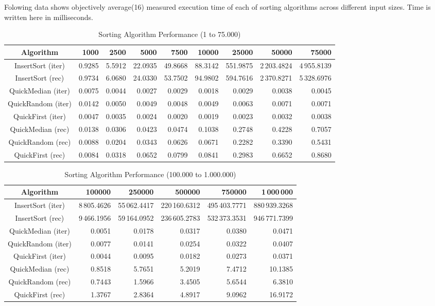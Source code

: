 \documentclass{article}
\begin{document}
Folowing data shows objectively average(16) measured execution time of each of sorting algorithms across different input sizes. Time is written here in milliseconds.
\begin{table}[h!]
    \centering
    \caption{Sorting Algorithm Performance (1 to 75.000)}
    \begin{tabular}{|c|r|r|r|r|r|r|r|r|}
        \toprule
        Algorithm & 1000 & 2500 & 5000 & 7500 & 10000 & 25000 & 50000 & 75000 \\
        \midrule
        InsertSort (iter) & 0.9285 & 5.5912 & 22.0935 & 49.8668 & 88.3142 & 551.9875 & 2\,203.4824 & 4\,955.8139 \\
        InsertSort (rec)  & 0.9734 & 6.0680 & 24.0330 & 53.7502 & 94.9802 & 594.7616 & 2\,370.8271 & 5\,328.6976 \\
        QuickMedian (iter)& 0.0075 & 0.0044 & 0.0027 & 0.0029 & 0.0018 & 0.0029 & 0.0038 & 0.0045 \\
        QuickRandom (iter)& 0.0142 & 0.0050 & 0.0049 & 0.0048 & 0.0049 & 0.0063 & 0.0071 & 0.0071 \\
        QuickFirst (iter) & 0.0047 & 0.0035 & 0.0024 & 0.0020 & 0.0019 & 0.0023 & 0.0032 & 0.0038 \\
        QuickMedian (rec) & 0.0138 & 0.0306 & 0.0423 & 0.0474 & 0.1038 & 0.2748 & 0.4228 & 0.7057 \\
        QuickRandom (rec) & 0.0088 & 0.0204 & 0.0343 & 0.0626 & 0.0671 & 0.2282 & 0.3390 & 0.5431 \\
        QuickFirst (rec)  & 0.0084 & 0.0318 & 0.0652 & 0.0799 & 0.0841 & 0.2983 & 0.6652 & 0.8680 \\
        \bottomrule
    \end{tabular}
\end{table}

\begin{table}[h!]
    \centering
    \caption{Sorting Algorithm Performance (100.000 to 1.000.000)}
    \begin{tabular}{|c|r|r|r|r|r|}
        \toprule
        Algorithm & 100000 & 250000 & 500000 & 750000 & 1\,000\,000 \\
        \midrule
        InsertSort (iter) & 8\,805.4626 & 55\,062.4417 & 220\,160.6312 & 495\,403.7771 & 880\,939.3268 \\
        InsertSort (rec)  & 9\,466.1956 & 59\,164.0952 & 236\,605.2783 & 532\,373.3531 & 946\,771.7399 \\
        QuickMedian (iter)& 0.0051 & 0.0178 & 0.0317 & 0.0380 & 0.0471 \\
        QuickRandom (iter)& 0.0077 & 0.0141 & 0.0254 & 0.0322 & 0.0407 \\
        QuickFirst (iter) & 0.0044 & 0.0095 & 0.0182 & 0.0273 & 0.0371 \\
        QuickMedian (rec) & 0.8518 & 5.7651 & 5.2019 & 7.4712 & 10.1385 \\
        QuickRandom (rec) & 0.7443 & 1.5966 & 3.4505 & 5.6544 & 6.3810 \\
        QuickFirst (rec)  & 1.3767 & 2.8364 & 4.8917 & 9.0962 & 16.9172 \\
        \bottomrule
    \end{tabular}
\end{table}
\end{document}
